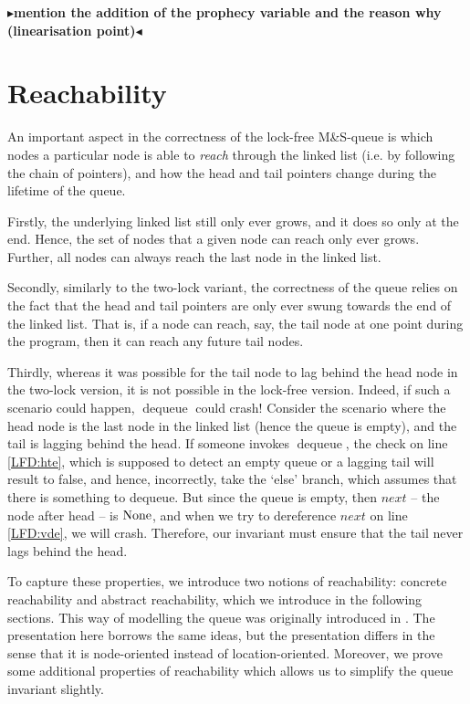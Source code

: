 \documentclass[a4paper, 11pt]{report}
\newcommand{\dequeue}{\operatorname{dequeue}}
\newcommand{\todo}[1]{{\color[rgb]{.5,0,0}\textbf{$\blacktriangleright$#1$\blacktriangleleft$}}}
\begin{document}
\todo{mention the addition of the prophecy variable and the reason why (linearisation point)}

\section{Reachability}
\label{LFMSQ:section:reachability}

An important aspect in the correctness of the lock-free M\&S-queue is which nodes a particular node is able to \textit{reach} through the linked list (i.e. by following the chain of pointers), and how the head and tail pointers change during the lifetime of the queue.

Firstly, the underlying linked list still only ever grows, and it does so only at the end. Hence, the set of nodes that a given node can reach only ever grows. Further, all nodes can always reach the last node in the linked list.

Secondly, similarly to the two-lock variant, the correctness of the queue relies on the fact that the head and tail pointers are only ever swung towards the end of the linked list. That is, if a node can reach, say, the tail node at one point during the program, then it can reach any future tail nodes.

Thirdly, whereas it was possible for the tail node to lag behind the head node in the two-lock version, it is not possible in the lock-free version. Indeed, if such a scenario could happen, $\dequeue$ could crash! Consider the scenario where the head node is the last node in the linked list (hence the queue is empty), and the tail is lagging behind the head. If someone invokes $\dequeue$, the check on line \ref{LFD:hte}, which is supposed to detect an empty queue or a lagging tail will result to false, and hence, incorrectly, take the `else' branch, which assumes that there is something to dequeue. But since the queue is empty, then $next$ -- the node after head -- is $\operatorname{None}$, and when we try to dereference $next$ on line \ref{LFD:vde}, we will crash. Therefore, our invariant must ensure that the tail never lags behind the head.

To capture these properties, we introduce two notions of reachability: concrete reachability and abstract reachability, which we introduce in the following sections. This way of modelling the queue was originally introduced in \cite{DBLP:conf/cpp/VindumB21}. The presentation here borrows the same ideas, but the presentation differs in the sense that it is node-oriented instead of location-oriented. Moreover, we prove some additional properties of reachability which allows us to simplify the queue invariant slightly.
\end{document}
